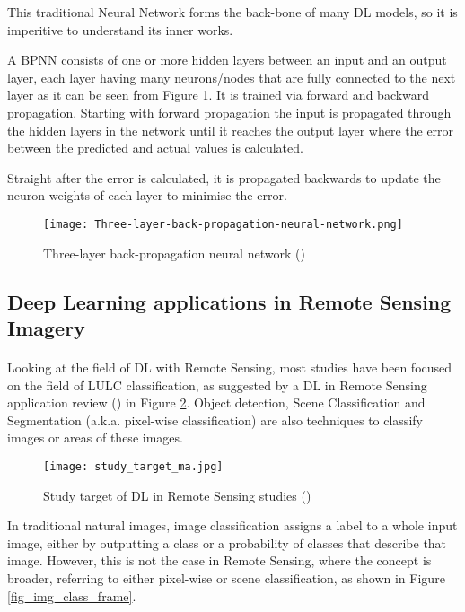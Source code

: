 This traditional Neural Network forms the back-bone of many \gls{DL} models, so it is imperitive to understand its inner works.

A \gls{BPNN} consists of one or more hidden layers between an input and an output layer, each layer having many neurons/nodes that are fully connected to the next layer as it can be seen from Figure \ref{fig_bpnn}. It is trained via forward and backward propagation. Starting with forward propagation the input is propagated through the hidden layers in the network until it reaches the output layer where the error between the predicted and actual values is calculated. 

Straight after the error is calculated, it is propagated backwards to update the neuron weights of each layer to minimise the error.

    \begin{figure}[hbt!]
        \centering
        \texttt{[image: Three-layer-back-propagation-neural-network.png]}
        \caption{Three-layer back-propagation neural network (\cite{NNpic})}
        \label{fig_bpnn}
    \end{figure}

\subsection{Deep Learning applications in Remote Sensing Imagery} \label{dl_rs}
\paragraph{}
Looking at the field of \gls{DL} with Remote Sensing, most studies have been focused on the field of \gls{LULC} classification, as suggested by a \gls{DL} in Remote Sensing application review (\cite{MA2019166}) in Figure \ref{fig_dl_studies}. Object detection, Scene Classification and Segmentation (\gls{a.k.a.} pixel-wise classification) are also techniques to classify images or areas of these images.

    \begin{figure}[hbt!]
        \centering
        \texttt{[image: study\_target\_ma.jpg]}
        \caption{Study target of DL in Remote Sensing studies (\cite{MA2019166})}
        \label{fig_dl_studies}
    \end{figure}

In traditional natural images, image classification assigns a label to a whole input image, either by outputting a class or a probability of classes that describe that image. However, this is not the case in Remote Sensing, where the concept is broader, referring to either pixel-wise or scene classification, as shown in Figure \ref{fig_img_class_frame}.

